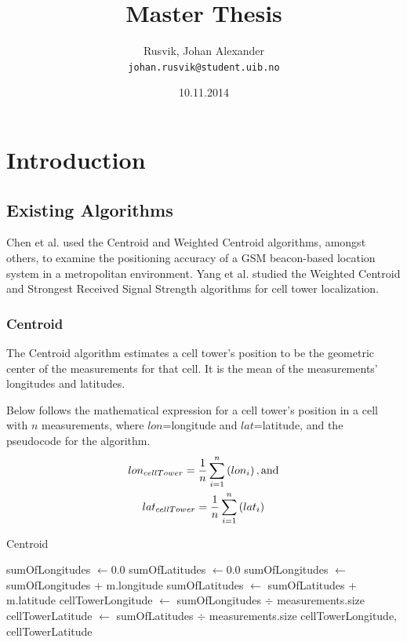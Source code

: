 \documentclass[a4paper, 12pt]{article}
\title{Master Thesis}%
\author{
    Rusvik, Johan Alexander\\
    \texttt{johan.rusvik@student.uib.no}
}
\date{10.11.2014}
\begin{document}
\maketitle

\newpage
\tableofcontents

\newpage
\listoffigures


\newpage
\listofalgorithms

\newpage
\section{Introduction}

\subsection{Existing Algorithms}
Chen et al. \cite{Chen} used the Centroid and Weighted Centroid algorithms, amongst others, to examine the positioning accuracy of a GSM beacon-based location system in a metropolitan environment. Yang et al. \cite{Yang} studied the Weighted Centroid and Strongest Received Signal Strength algorithms for cell tower localization.

\subsubsection{Centroid}
The Centroid algorithm estimates a cell tower's position to be the geometric center of the measurements for that cell. It is the mean of the measurements' longitudes and latitudes.

Below follows the mathematical expression for a cell tower's position in a cell with $n$ measurements, where $lon$=longitude and $lat$=latitude, and the pseudocode for the algorithm.
\begin{gather*}
lon_{cellTower} = \frac{1}{n}\sum^{n}_{i=1}\left(lon_i\right), \textnormal{and}\\
lat_{cellTower} = \frac{1}{n}\sum^{n}_{i=1}\left(lat_i\right)
\end{gather*}

\newpage
\begin{algorithm}
\caption{Centroid}
\label{alg:centroid}
\begin{algorithmic}[1]
\State sumOfLongitudes $\gets 0.0$
\State sumOfLatitudes $\gets 0.0$
\State sumOfLongitudes $\gets$ sumOfLongitudes + m.longitude
\State sumOfLatitudes $\gets$ sumOfLatitudes + m.latitude
\EndFor
\State cellTowerLongitude $\gets$ sumOfLongitudes $\div$ measurements.size
\State cellTowerLatitude $\gets$ sumOfLatitudes $\div$ measurements.size
\State \Return cellTowerLongitude, cellTowerLatitude
\EndProcedure
\end{algorithmic}
\end{algorithm}
\end{document}

